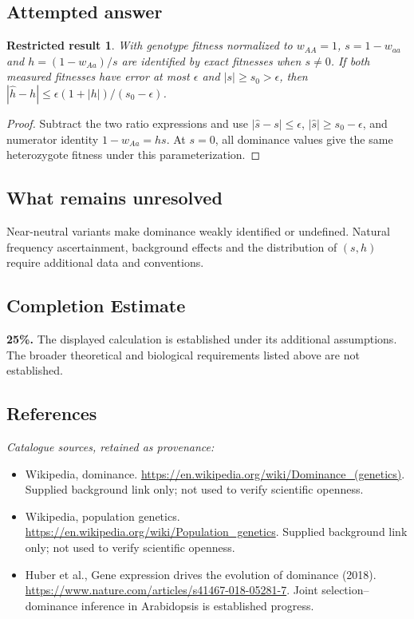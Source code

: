 \documentclass[11pt]{article}
\newtheorem{attemptresult}{Restricted result}[section]
\begin{document}
\subsection{Attempted answer}
\begin{attemptresult}
With genotype fitness normalized to $w_{AA}=1$, $s=1-w_{aa}$ and $h=(1-w_{Aa})/s$ are identified by exact fitnesses when $s\ne0$. If both measured fitnesses have error at most $\epsilon$ and $|s|\geq s_0>\epsilon$, then $|\widehat h-h|\leq\epsilon(1+|h|)/(s_0-\epsilon)$.
\end{attemptresult}
\begin{proof}
Subtract the two ratio expressions and use $|\widehat s-s|\leq\epsilon$, $|\widehat s|\geq s_0-\epsilon$, and numerator identity $1-w_{Aa}=hs$. At $s=0$, all dominance values give the same heterozygote fitness under this parameterization.
\end{proof}
\subsection{What remains unresolved}
Near-neutral variants make dominance weakly identified or undefined. Natural frequency ascertainment, background effects and the distribution of $(s,h)$ require additional data and conventions.
\subsection{Completion Estimate}
\textbf{25\%.} The displayed calculation is established under its additional assumptions. The broader theoretical and biological requirements listed above are not established.
\subsection{References}
\noindent\emph{Catalogue sources, retained as provenance:}
\begin{itemize}
\item Wikipedia, dominance. \url{https://en.wikipedia.org/wiki/Dominance_(genetics)}. Supplied background link only; not used to verify scientific openness.
\item Wikipedia, population genetics. \url{https://en.wikipedia.org/wiki/Population_genetics}. Supplied background link only; not used to verify scientific openness.
\item Huber et al., Gene expression drives the evolution of dominance (2018). \url{https://www.nature.com/articles/s41467-018-05281-7}. Joint selection--dominance inference in Arabidopsis is established progress.
\end{itemize}
\clearpage
\end{document}
